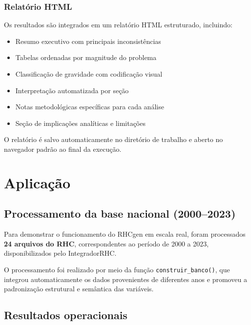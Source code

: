 \documentclass[
  brazilian,
  a4paper,
  oneside]{scrbook}
\providecommand{\tightlist}{%
  \setlength{\itemsep}{0pt}\setlength{\parskip}{0pt}}
\begin{document}
\subsection{Relatório HTML}\label{relatuxf3rio-html}

Os resultados são integrados em um relatório HTML estruturado,
incluindo:

\begin{itemize}
\tightlist
\item
  Resumo executivo com principais inconsistências
\item
  Tabelas ordenadas por magnitude do problema
\item
  Classificação de gravidade com codificação visual
\item
  Interpretação automatizada por seção
\item
  Notas metodológicas específicas para cada análise
\item
  Seção de implicações analíticas e limitações
\end{itemize}

O relatório é salvo automaticamente no diretório de trabalho e aberto no
navegador padrão ao final da execução.


\chapter{Aplicação}\label{aplicauxe7uxe3o}

\section{Processamento da base nacional
(2000--2023)}\label{processamento-da-base-nacional-20002023}

Para demonstrar o funcionamento do RHCgen em escala real, foram
processados \textbf{24 arquivos do RHC}, correspondentes ao período de
2000 a 2023, disponibilizados pelo IntegradorRHC.

O processamento foi realizado por meio da função
\texttt{construir\_banco()}, que integrou automaticamente os dados
provenientes de diferentes anos e promoveu a padronização estrutural e
semântica das variáveis.

\section{Resultados operacionais}\label{resultados-operacionais}
\end{document}
